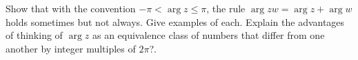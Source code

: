 \documentclass[space,nooutcomes]{ximera}
\begin{document}
\begin{problem}
Show that with the convention $-\pi<\arg{z}\le\pi$, the rule $\arg{zw}=\arg{z}+\arg{w}$ holds sometimes but not always.  Give examples of each.  Explain the advantages of thinking of $\arg{z}$ as an equivalence class of numbers that differ from one another by integer multiples of $2\pi$?.
\vfill 
\end{problem}

%
\end{document}
